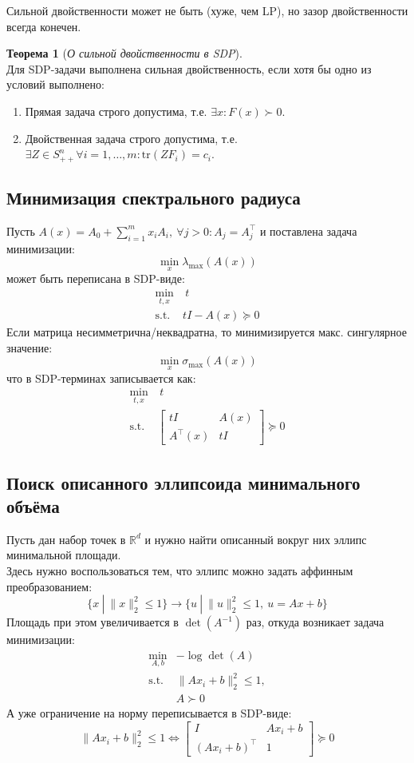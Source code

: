 \documentclass[11pt,a4paper]{report}
\def\Real{\mathbb{R}}
\def \tr{\mbox{tr}}
\def\le{\leqslant}
\theoremstyle{definition}
\theoremstyle{definition}
\newtheorem{theorem}{Теорема}[section]
\theoremstyle{definition}
\begin{document}
	\noindent Сильной двойственности может не быть (хуже, чем LP), но зазор двойственности всегда конечен.
	\begin{theorem}[\textit{О сильной двойственности в SDP}]$  $\\
		Для SDP-задачи выполнена сильная двойственность, если хотя бы одно из условий выполнено:
		\begin{enumerate}[$\diamond$]
			\item Прямая задача строго допустима, т.е. $ \exists x: F(x) \succ 0 $.
			\item Двойственная задача строго допустима, т.е. $ \exists Z \in S^n_{++} \forall i = 1,\ldots,m: \tr(ZF_i) = c_i $.
		\end{enumerate}
	\end{theorem}
	\subsection{Минимизация спектрального радиуса}
	Пусть $ A(x) = A_0 + \sum_{i=1}^{m} x_i A_i,\ \forall j > 0: A_j = A_j^\top $ и поставлена задача минимизации:
	$$
		\min_{x} \lambda_{\max}(A(x))
	$$
	может быть переписана в SDP-виде:
	\begin{align*}
		\min_{t, x}&\ t\\ 
		\text{s.t. }& tI - A(x) \succeq 0
	\end{align*}
	Если матрица несимметрична/неквадратна, то минимизируется макс. сингулярное значение:
	$$
		\min_{x} \sigma_{\max}(A(x))
	$$
	что в SDP-терминах записывается как:
	\begin{align*}
		\min_{t, x}&\ t\\ 
		\text{s.t. }& 
			\begin{bmatrix} 
				tI & A(x)\\
				A^\top(x) & tI
			\end{bmatrix} \succeq 0
	\end{align*}
	\subsection{Поиск описанного эллипсоида минимального объёма}
	Пусть дан набор точек в $ \Real^d $ и нужно найти описанный вокруг них эллипс минимальной площади.\\
	Здесь нужно воспользоваться тем, что эллипс можно задать аффинным преобразованием:
	$$
		\{ x\ |\ \| x \|_2^2 \le 1 \} \to \{ u\ |\ \| u \|_2^2 \le 1,\ u = Ax + b \}
	$$
	Площадь при этом увеличивается в $ \det(A^{-1}) $ раз, откуда возникает задача минимизации:
	\begin{align*}
		\min_{A, b}& -\log \det (A)\\
		\text{s.t. }& \| Ax_i + b \|_2^2 \le 1,\\
								& A \succ 0
	\end{align*}
	А уже ограничение на норму переписывается в SDP-виде:
	$$
		\| Ax_i + b \|_2^2 \le 1 \iff 
		\begin{bmatrix}
			I & Ax_i + b\\
			(Ax_i + b)^{\top} & 1 
		\end{bmatrix} \succeq 0
	$$
\end{document}
